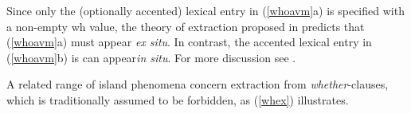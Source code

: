 \documentclass[output=paper
	        ,collection
	        ,collectionchapter
 	        ,biblatex
                ,babelshorthands
                ,newtxmath
                ,draftmode
                ,colorlinks, citecolor=brown
]{langscibook}
\begin{document}
\eal \label{whoavm}



\zl

Since only the (optionally accented) lexical entry in (\ref{whoavm}a) is specified with a 
non-empty {\sc wh} value, the theory of  extraction proposed in \citet{ginzsag} predicts 
that (\ref{whoavm}a) must appear \emph{ex situ}.  In contrast, the accented lexical entry in
 (\ref{whoavm}b) is can  appear\emph{in situ}. For more discussion see  \citet[261]{levhubook}.

A related range of island phenomena concern extraction from \emph{whether}-clauses, 
which is traditionally assumed to be forbidden, as (\ref{whex}) illustrates.

\eal \label{whex}
\zl 
\end{document}
